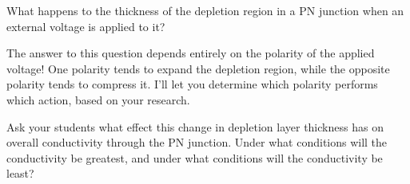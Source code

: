 

What happens to the thickness of the depletion region in a PN junction when an external voltage is applied to it? 







The answer to this question depends entirely on the polarity of the applied voltage!  One polarity tends to expand the depletion region, while the opposite polarity tends to compress it.  I'll let you determine which polarity performs which action, based on your research.







Ask your students what effect this change in depletion layer thickness has on overall conductivity through the PN junction.  Under what conditions will the conductivity be greatest, and under what conditions will the conductivity be least?




